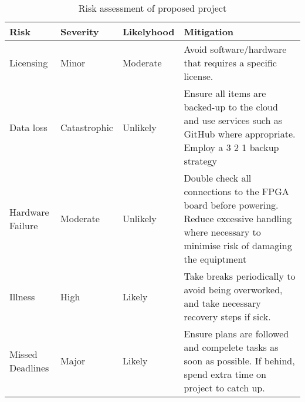 \begin{table}[hbt!]
    \centering%
        \begin{tabularx}{\textwidth}{ lllX }
            \hline
            Risk       & Severity & Likelyhood & Mitigation  \\ \hline

            Licensing & Minor & Moderate & Avoid software/hardware that requires a specific license. \\
            Data loss & Catastrophic & Unlikely & Ensure all items are backed-up to the cloud and use services such as GitHub where appropriate. Employ a 3 2 1 backup strategy \\
            Hardware Failure & Moderate & Unlikely & Double check all connections to the FPGA board before powering. Reduce excessive handling where necessary to minimise risk of damaging the equiptment \\
            Illness & High & Likely & Take breaks periodically to avoid being overworked, and take necessary recovery steps if sick. \\
            Missed Deadlines & Major & Likely & Ensure plans are followed and compelete tasks as soon as possible. If behind, spend extra time on project to catch up.\\
    
            \hline
            \end{tabularx}
    \caption{ Risk assessment of proposed project}\label{table:milestones}
    \end{table}
     
    